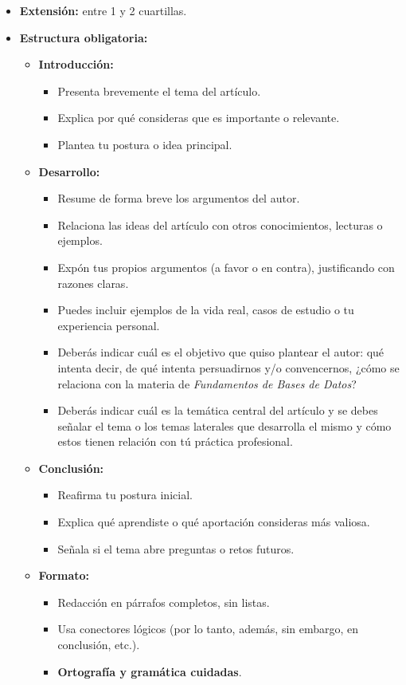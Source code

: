 \documentclass[12pt]{report}
\begin{document}
\begin{enumerate}[label=\textbf{\arabic*.}, leftmargin=*]
\begin{enumerate}[label=\textbf{\alph*.}, leftmargin=*, itemsep=1.0em]
\begin{itemize}
  \item \textbf{Extensi\'on:} entre 1 y 2 cuartillas.
  \item \textbf{Estructura obligatoria:}
  \begin{itemize}
    \item \textbf{Introducci\'on:}
    \begin{itemize}
      \item Presenta brevemente el tema del art\'iculo.
      \item Explica por qu\'e consideras que es importante o relevante.
      \item Plantea tu postura o idea principal.
    \end{itemize}
    \item \textbf{Desarrollo:}
    \begin{itemize}
      \item Resume de forma breve los argumentos del autor.
      \item Relaciona las ideas del art\'iculo con otros conocimientos, lecturas o ejemplos.
      \item Exp\'on tus propios argumentos (a favor o en contra), justificando con razones claras.
      \item Puedes incluir ejemplos de la vida real, casos de estudio o tu experiencia personal.
      \item Deber\'as indicar cu\'al es el objetivo que quiso plantear el autor: qu\'e intenta decir, de qu\'e intenta persuadirnos y/o convencernos, ¿c\'omo se relaciona con la materia de \textit{Fundamentos de Bases de Datos}?
      \item Deber\'as indicar cu\'al es la tem\'atica central del art\'iculo y se debes se\~nalar el tema o los temas laterales que desarrolla el mismo y c\'omo estos tienen relaci\'on con t\'u pr\'actica profesional.
    \end{itemize}
    \item \textbf{Conclusi\'on:}
    \begin{itemize}
      \item Reafirma tu postura inicial.
      \item Explica qu\'e aprendiste o qu\'e aportaci\'on consideras m\'as valiosa.
      \item Se\~nala si el tema abre preguntas o retos futuros.
    \end{itemize}
    \item \textbf{Formato:}
    \begin{itemize}
      \item Redacci\'on en p\'arrafos completos, sin listas.
      \item Usa conectores l\'ogicos (por lo tanto, adem\'as, sin embargo, en conclusi\'on, etc.).
      \item \textbf{Ortograf\'ia y gram\'atica cuidadas}.
    \end{itemize}
  \end{itemize}
\end{itemize}




\end{enumerate}
\end{enumerate}
\end{document}
